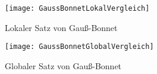 \begin{minipage}{.45\textwidth}
  \begin{figure}[H]
    \texttt{[image: GaussBonnetLokalVergleich]}
    \vspace*{1em}
    \caption{Lokaler Satz von Gauß-Bonnet}
  \end{figure}
\end{minipage}
\hfill
\begin{minipage}{.475\textwidth}
  \begin{figure}[H]
    \texttt{[image: GaussBonnetGlobalVergleich]}
    \caption{Globaler Satz von Gauß-Bonnet}
  \end{figure}
\end{minipage}